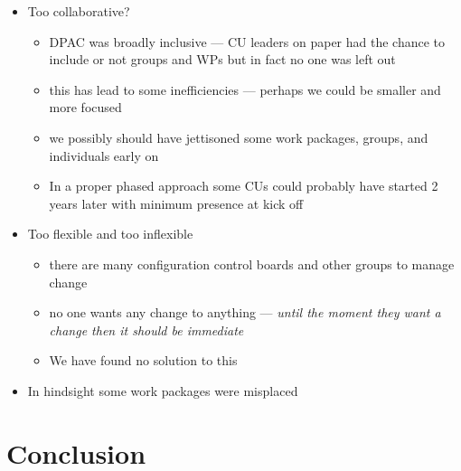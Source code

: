 {\begin{itemize}
  \begin{itemize}
    \item More management support in setting up the CUs and reporting would have been good ---
      {\color{red} perhaps more emphasis should have been put here by DPACE}
    \item The Project Office (PO) came along too late to assist with shaping this --- it was good and should have started earlier 
  \end{itemize}
\item Too collaborative? 
  \begin{itemize}
    \item DPAC was broadly inclusive --- CU leaders on paper had the chance to include or not groups
      and WPs but in fact no one was left out
    \item this has lead to some inefficiencies --- perhaps we could be smaller and more focused 
    \item we possibly should have jettisoned some work packages, groups, and individuals early on
    \item {\color{blue} In a proper phased approach some CUs could probably have started 2 years
    later with minimum presence at kick off} 
  \end{itemize}
\item Too flexible and too inflexible 
  \begin{itemize}
    \item there are many configuration control boards and other groups to manage change
    \item no one wants any change to anything --- {\em until the moment they want a change  then it
      should be immediate}
    \item {\color{red} We have found no solution to this} 
  \end{itemize}
\item {\color{blue}In hindsight some work packages were misplaced}
\end{itemize}
}


\section{Conclusion}

